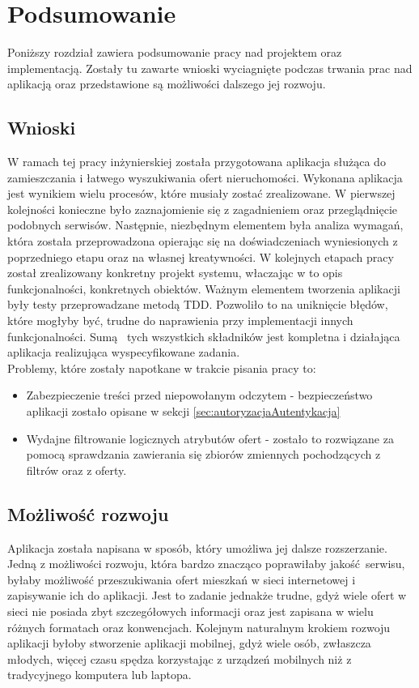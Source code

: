 \chapter{Podsumowanie}
\label{cha:podsumowanie}

Poniższy rozdział zawiera podsumowanie pracy nad projektem oraz implementacją. Zostały tu zawarte wnioski wyciagnięte podczas trwania prac nad aplikacją oraz przedstawione są możliwości dalszego jej rozwoju.

\section{Wnioski}
W ramach tej pracy inżynierskiej została przygotowana aplikacja służąca do zamieszczania i łatwego wyszukiwania ofert nieruchomości. Wykonana aplikacja jest wynikiem wielu procesów, które musiały zostać zrealizowane. W pierwszej kolejności konieczne było zaznajomienie się z zagadnieniem oraz przeglądnięcie podobnych serwisów. Następnie, niezbędnym elementem była analiza wymagań, która została przeprowadzona opierając się na doświadczeniach wyniesionych z poprzedniego etapu oraz na własnej kreatywności. W kolejnych etapach pracy został zrealizowany konkretny projekt systemu, właczając w to opis funkcjonalności, konkretnych obiektów. Ważnym elementem tworzenia aplikacji były testy przeprowadzane metodą TDD. Pozwoliło to na uniknięcie błędów, które mogłyby być, trudne do naprawienia przy implementacji innych funkcjonalności. Sumą  tych wszystkich składników jest kompletna i działająca aplikacja realizująca wyspecyfikowane zadania.\\
Problemy, które zostały napotkane w trakcie pisania pracy to:
\begin{itemize}
\item Zabezpieczenie treści przed niepowołanym odczytem - bezpieczeństwo aplikacji zostało opisane w sekcji  \ref{sec:autoryzacjaAutentykacja}
\item Wydajne filtrowanie logicznych atrybutów ofert - zostało to rozwiązane za pomocą sprawdzania zawierania się zbiorów zmiennych pochodzących z filtrów oraz z oferty.
\end{itemize}

\section{Możliwość rozwoju}
Aplikacja została napisana w sposób, który umożliwa jej dalsze rozszerzanie. Jedną z możliwości rozwoju, która bardzo znacząco poprawiłaby jakość serwisu, byłaby możliwość przeszukiwania ofert mieszkań w sieci internetowej i zapisywanie ich do aplikacji. Jest to zadanie jednakże trudne, gdyż wiele ofert w sieci nie posiada zbyt szczegółowych informacji oraz jest zapisana w wielu różnych formatach oraz konwencjach. Kolejnym naturalnym krokiem rozwoju aplikacji byłoby stworzenie aplikacji mobilnej, gdyż wiele osób, zwłaszcza młodych, więcej czasu spędza korzystając z urządzeń mobilnych niż z tradycyjnego komputera lub laptopa.
